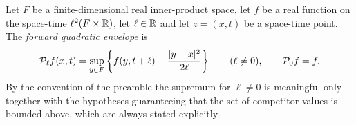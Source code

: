 \begin{definition}
Let $F$ be a finite-dimensional real inner-product space, let $f$ be a real
function on the space-time $\ell^2(F\times\mathbb{R})$, let $\ell\in\mathbb{R}$ and let
$z=(x,t)$ be a space-time point. The \emph{forward quadratic envelope} is
\[
  \mathcal{P}_\ell f(x,t)
    =\sup_{y\in F}\left\{f(y,t+\ell)-\frac{|y-x|^2}{2\ell}\right\}
  \qquad(\ell\ne0),
  \qquad
  \mathcal{P}_0f=f .
\]
By the convention of the preamble the supremum for $\ell\ne0$ is meaningful only
together with the hypotheses guaranteeing that the set of competitor values is
bounded above, which are always stated explicitly.
\end{definition}
